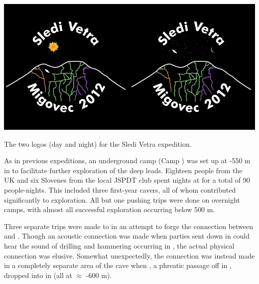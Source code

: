 \begin{pagefigure}
\checkoddpage \ifoddpage \forcerectofloat \else \forceversofloat \fi
   \centering
\includegraphics[width = \textwidth]{2012/overview/2012-01-29_print_res_both-png-scaled-1000.jpg}
\caption{The two logos (day and night) for the Sledi Vetra expedition. } \label{2012 logos}
\end{pagefigure}


As in previous expeditions, an underground camp (Camp
) was set up at -550 m in  to facilitate
further exploration of the deep leads. Eighteen people from the UK and
six Slovenes from the local JSPDT club spent nights at  for
a total of 90 people-nights. This included three first-year cavers, all
of whom contributed significantly to exploration. All but one pushing
trips were done on overnight camps, with almost all successful
exploration occurring below 500 m.

Three separate trips were made to  in an attempt to
forge the connection between  and . Though an
acoustic connection was made when parties sent down  in
 could hear the sound of drilling and hammering
occurring in , the actual physical connection was
elusive. Somewhat unexpectedly, the connection was instead made in a
completely separate area of the cave when , a
phreatic passage off  in ,
dropped into  in  (all at $\approx$ -600 m).


